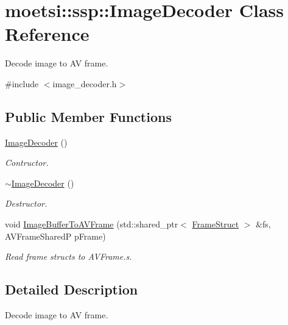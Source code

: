 \hypertarget{classmoetsi_1_1ssp_1_1ImageDecoder}{}\section{moetsi\+:\+:ssp\+:\+:Image\+Decoder Class Reference}
\label{classmoetsi_1_1ssp_1_1ImageDecoder}


Decode image to AV frame.  




{\ttfamily \#include $<$image\+\_\+decoder.\+h$>$}

\subsection*{Public Member Functions}
\begin{DoxyCompactItemize}
\item 
\mbox{\label{classmoetsi_1_1ssp_1_1ImageDecoder_a9054b4b5f32b6bcc000392680ea4ca5c}} 
\hyperlink{classmoetsi_1_1ssp_1_1ImageDecoder_a9054b4b5f32b6bcc000392680ea4ca5c}{Image\+Decoder} ()
\begin{DoxyCompactList}\small\item\em Contructor. \end{DoxyCompactList}\item 
\mbox{\label{classmoetsi_1_1ssp_1_1ImageDecoder_ad9bdd415935a982e8a36eb9d297e0f7f}} 
\hyperlink{classmoetsi_1_1ssp_1_1ImageDecoder_ad9bdd415935a982e8a36eb9d297e0f7f}{$\sim$\+Image\+Decoder} ()
\begin{DoxyCompactList}\small\item\em Destructor. \end{DoxyCompactList}\item 
void \hyperlink{classmoetsi_1_1ssp_1_1ImageDecoder_a7a4e299977711727385c4c4e127453d2}{Image\+Buffer\+To\+A\+V\+Frame} (std\+::shared\+\_\+ptr$<$ \hyperlink{structmoetsi_1_1ssp_1_1FrameStruct}{Frame\+Struct} $>$ \&fs, A\+V\+Frame\+SharedP p\+Frame)
\begin{DoxyCompactList}\small\item\em Read frame structs to A\+V\+Frame.\+s. \end{DoxyCompactList}\end{DoxyCompactItemize}


\subsection{Detailed Description}
Decode image to AV frame. 

